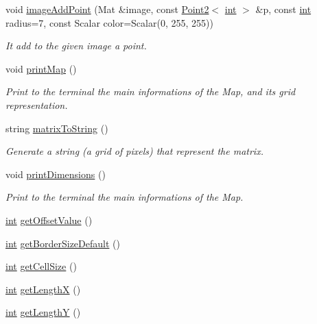 \begin{DoxyCompactItemize}
void \mbox{\hyperlink{class_mapp_ad06f82a4d6eeab35c39ed955679061d3}{image\+Add\+Point}} (Mat \&image, const \mbox{\hyperlink{class_point2}{Point2}}$<$ \mbox{\hyperlink{draw_8hh_aa620a13339ac3a1177c86edc549fda9b}{int}} $>$ \&p, const \mbox{\hyperlink{draw_8hh_aa620a13339ac3a1177c86edc549fda9b}{int}} radius=7, const Scalar color=Scalar(0, 255, 255))
\begin{DoxyCompactList}\small\item\em It add to the given image a point. \end{DoxyCompactList}\item 
void \mbox{\hyperlink{class_mapp_ab795b79c5d655f6a62303c4a415ee73c}{print\+Map}} ()
\begin{DoxyCompactList}\small\item\em Print to the terminal the main informations of the Map, and its grid representation. \end{DoxyCompactList}\item 
string \mbox{\hyperlink{class_mapp_ad38f31eac2ad66836325c152db1f88c3}{matrix\+To\+String}} ()
\begin{DoxyCompactList}\small\item\em Generate a string (a grid of pixels) that represent the matrix. \end{DoxyCompactList}\item 
void \mbox{\hyperlink{class_mapp_a0405773fd644d183c603b569e9957248}{print\+Dimensions}} ()
\begin{DoxyCompactList}\small\item\em Print to the terminal the main informations of the Map. \end{DoxyCompactList}\item 
\mbox{\hyperlink{draw_8hh_aa620a13339ac3a1177c86edc549fda9b}{int}} \mbox{\hyperlink{class_mapp_ae67f05c7e6ddb6dbff4da049016e96bd}{get\+Offset\+Value}} ()
\item 
\mbox{\hyperlink{draw_8hh_aa620a13339ac3a1177c86edc549fda9b}{int}} \mbox{\hyperlink{class_mapp_a2f867ee7600f6953cf7df1f61ea61290}{get\+Border\+Size\+Default}} ()
\item 
\mbox{\hyperlink{draw_8hh_aa620a13339ac3a1177c86edc549fda9b}{int}} \mbox{\hyperlink{class_mapp_a964609f3405a097bc0dbc6d4b8e19f47}{get\+Cell\+Size}} ()
\item 
\mbox{\hyperlink{draw_8hh_aa620a13339ac3a1177c86edc549fda9b}{int}} \mbox{\hyperlink{class_mapp_ac096fed408149529dd24872a79bffb52}{get\+LengthX}} ()
\item 
\mbox{\hyperlink{draw_8hh_aa620a13339ac3a1177c86edc549fda9b}{int}} \mbox{\hyperlink{class_mapp_a809dabaf3b443c877d1a51c0a8cea1d2}{get\+LengthY}} ()

\end{DoxyCompactItemize}
